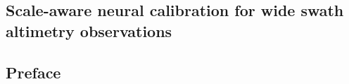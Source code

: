 \begin{bibunit}

\clearemptydoublepage
  \chapter{Scale-aware neural calibration for wide swath altimetry observations}

  



\section{Preface}



\end{bibunit}
